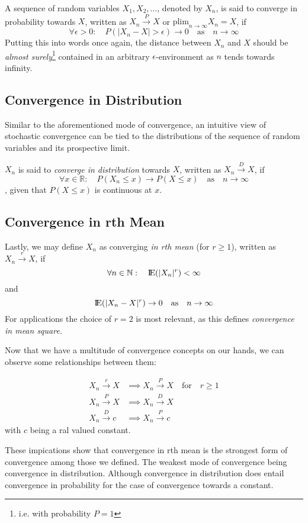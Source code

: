 \documentclass[12pt]{article}
\newcommand{\E}{\mbox{I\negthinspace E}}
\begin{document}
A sequence of random variables $X_1, X_2, ...$, denoted by $X_n$, is said to converge in probability towards $X$, written as $X_n \overset{P}\to X$ or $\text{plim}_{n \to \infty} X_n  = X$, if
\[
\forall \epsilon > 0 :\quad P(|X_n - X| > \epsilon) \to 0 \quad \text{as} \quad n \to \infty
\]
Putting this into words once again, the distance between $X_n$ and $X$ should be \textit{almost surely}\footnote{i.e. with probability $P=1$} contained in an arbitrary $\epsilon$-environment as $n$ tends towards infinity.

\subsection{Convergence in Distribution}
Similar to the aforementioned mode of convergence, an intuitive view of stochastic convergence can be tied to the distributions of the sequence of random variables and its prospective limit.

$X_n$ is said to \textit{converge in distribution} towards $X$, written as $X_n \overset{D}\to X$, if 
\[
\forall x \in \mathbb{R} : \quad P(X_n \leq x) \to P(X \leq x) \quad \text{as} \quad n \to \infty
\]
, given that $P(X \leq x)$ is continuous at $x$.

\subsection{Convergence in rth Mean}
Lastly, we may define $X_n$ as converging \textit{in rth mean} (for $r \geq 1$), written as $X_n \overset{r}\to X$, if 
\[
\forall n \in \mathbb{N}: \quad \E{(|X_n|^r)} < \infty 
\] and 
\[
\E{(|X_n - X|^r)} \to 0 \quad \text{as} \quad n \to \infty
\]
For applications the choice of $r= 2$ is most relevant, as this defines \textit{convergence in mean square}.

Now that we have a multitude of convergence concepts on our hands, we can observe some relationships between them:

\begin{align*}
X_n \overset{r}\to X &\implies X_n \overset{P}\to X \quad \text{for} \quad r \geq 1 \\
X_n \overset{P}\to X &\implies X_n \overset{D}\to X \\
X_n \overset{D}\to c &\implies X_n \overset{P}\to c
\end{align*}
with $c$ being a ral valued constant.

These impications show that convergence in rth mean is the strongest form of convergence among those we defined. The weakest mode of convergence being convergence in distribution. Although convergence in distribution does entail convergence in probability for the case of convergence towards a constant.
\end{document}
